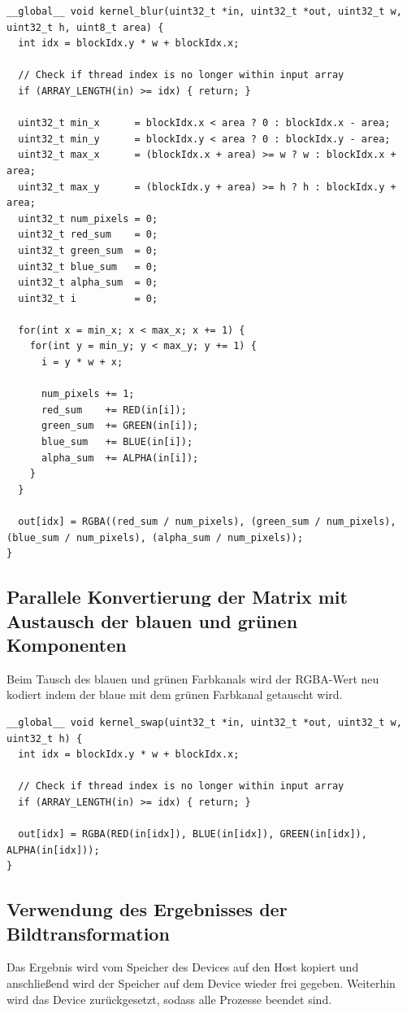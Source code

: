 \documentclass{llncs}
\begin{document}
\begin{lstlisting}
__global__ void kernel_blur(uint32_t *in, uint32_t *out, uint32_t w, uint32_t h, uint8_t area) {
  int idx = blockIdx.y * w + blockIdx.x;

  // Check if thread index is no longer within input array
  if (ARRAY_LENGTH(in) >= idx) { return; }

  uint32_t min_x      = blockIdx.x < area ? 0 : blockIdx.x - area;
  uint32_t min_y      = blockIdx.y < area ? 0 : blockIdx.y - area;
  uint32_t max_x      = (blockIdx.x + area) >= w ? w : blockIdx.x + area;
  uint32_t max_y      = (blockIdx.y + area) >= h ? h : blockIdx.y + area;
  uint32_t num_pixels = 0;
  uint32_t red_sum    = 0;
  uint32_t green_sum  = 0;
  uint32_t blue_sum   = 0;
  uint32_t alpha_sum  = 0;
  uint32_t i          = 0;

  for(int x = min_x; x < max_x; x += 1) {
    for(int y = min_y; y < max_y; y += 1) {
      i = y * w + x;

      num_pixels += 1;
      red_sum    += RED(in[i]);
      green_sum  += GREEN(in[i]);
      blue_sum   += BLUE(in[i]);
      alpha_sum  += ALPHA(in[i]);
    }
  }

  out[idx] = RGBA((red_sum / num_pixels), (green_sum / num_pixels), (blue_sum / num_pixels), (alpha_sum / num_pixels));
}
\end{lstlisting}
%
\subsection{Parallele Konvertierung der Matrix mit Austausch der blauen und grünen Komponenten}
%
Beim Tausch des blauen und grünen Farbkanals wird der RGBA-Wert neu kodiert indem der blaue mit dem grünen Farbkanal getauscht wird.

\begin{lstlisting}
__global__ void kernel_swap(uint32_t *in, uint32_t *out, uint32_t w, uint32_t h) {
  int idx = blockIdx.y * w + blockIdx.x;

  // Check if thread index is no longer within input array
  if (ARRAY_LENGTH(in) >= idx) { return; }

  out[idx] = RGBA(RED(in[idx]), BLUE(in[idx]), GREEN(in[idx]), ALPHA(in[idx]));
}
\end{lstlisting}


%
\subsection{Verwendung des Ergebnisses der Bildtransformation}
%
Das Ergebnis wird vom Speicher des Devices auf den Host kopiert und anschließend wird der Speicher auf dem Device wieder frei gegeben. Weiterhin wird das Device zurückgesetzt, sodass alle Prozesse beendet sind.\\
\end{document}
